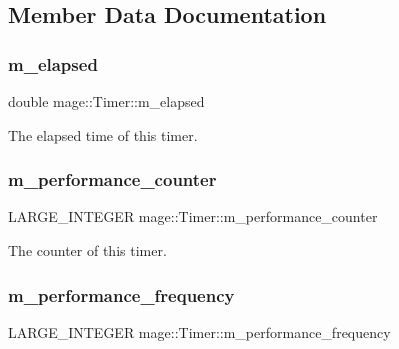 \subsection{Member Data Documentation}
\hypertarget{classmage_1_1_timer_aa2c50b9ffa85600791a21e2db4c43e91}{}\label{classmage_1_1_timer_aa2c50b9ffa85600791a21e2db4c43e91} 
\subsubsection{\texorpdfstring{m\+\_\+elapsed}{m\_elapsed}}
{\footnotesize\ttfamily double mage\+::\+Timer\+::m\+\_\+elapsed\hspace{0.3cm}{\ttfamily [protected]}}

The elapsed time of this timer. \hypertarget{classmage_1_1_timer_a70bdbf53f8cd69a46db8b75e08d3ead8}{}\label{classmage_1_1_timer_a70bdbf53f8cd69a46db8b75e08d3ead8} 
\subsubsection{\texorpdfstring{m\+\_\+performance\+\_\+counter}{m\_performance\_counter}}
{\footnotesize\ttfamily L\+A\+R\+G\+E\+\_\+\+I\+N\+T\+E\+G\+ER mage\+::\+Timer\+::m\+\_\+performance\+\_\+counter\hspace{0.3cm}{\ttfamily [protected]}}

The counter of this timer. \hypertarget{classmage_1_1_timer_a1618c4901b6f898165a2d79d02a2518e}{}\label{classmage_1_1_timer_a1618c4901b6f898165a2d79d02a2518e} 
\subsubsection{\texorpdfstring{m\+\_\+performance\+\_\+frequency}{m\_performance\_frequency}}
{\footnotesize\ttfamily L\+A\+R\+G\+E\+\_\+\+I\+N\+T\+E\+G\+ER mage\+::\+Timer\+::m\+\_\+performance\+\_\+frequency\hspace{0.3cm}{\ttfamily [protected]}}

